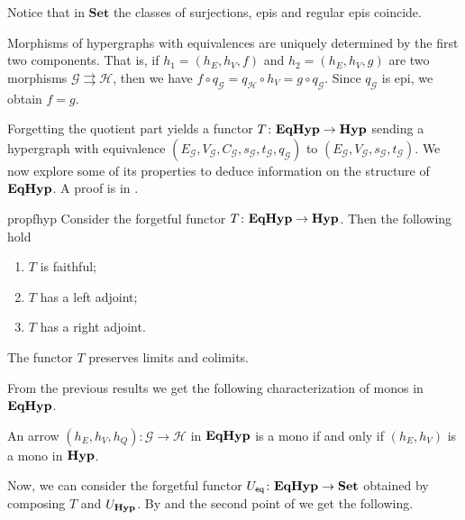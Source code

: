 \documentclass[3p]{elsarticle}
\newcommand{\eq}{\mathsf{eq}}
\newcommand{\Set}{\mathbf{Set}}
\newcommand{\catname}[1]{\textbf{\textup{#1}}}
\newcommand{\hyp}{\catname{Hyp}}
\newcommand{\EqHyp}{\catname{EqHyp}} %
\theoremstyle{remark}
\theoremstyle{definition}
\begin{document}
\begin{rem}
	Notice that in $\Set$ the classes of surjections, epis and regular epis coincide.
\end{rem}

\begin{rem}\label{rem:eqhyp_morphs}
	Morphisms of hypergraphs with equivalences are uniquely determined by the first two components. That is, if $h_1 = (h_E, h_V, f)$ and $h_2 = (h_E, h_V, g)$ are two morphisms $\mathcal{G} \rightrightarrows \mathcal{H}$, then we have
	$
	f \circ q_\mathcal{G} = q_\mathcal{H}\circ h_V =g\circ q_\mathcal{G}.
	$
	Since $q_\mathcal{G}$ is epi, we obtain $f = g$.
\end{rem}

Forgetting the quotient part yields a functor $T\colon \EqHyp \to \hyp$ sending a hypergraph with equivalence $(E_\mathcal{G}, V_{\mathcal{G}}, C_\mathcal{G}, s_\mathcal{G}, t_\mathcal{G}, q_\mathcal{G})$ to $(E_{\mathcal{G}}, V_{\mathcal{G}}, s_\mathcal{G}, t_{\mathcal{G}})$.   We now explore some of its properties to deduce information on the structure of $\EqHyp$.  
%
A proof is in .


\begin{restatable}{prop}{fhyp}\label{prop:forghyp}  Consider the forgetful functor $T\colon \EqHyp \to \hyp$. Then the following hold
	\begin{enumerate}
		\item$T$ is faithful;
		\item $T$ has a left adjoint;
		\item $T$ has a right adjoint.
	\end{enumerate}
\end{restatable}

\begin{cor}\label{cor:limcolim}
	The functor $T$ preserves limits and colimits.
\end{cor}

From the previous results we get the following characterization of monos in $\EqHyp$.

\begin{cor}\label{cor:mono1}
	An arrow $(h_E, h_V, h_Q): \mathcal{G \to H}$ in $\EqHyp$ is a mono if and only if $(h_E, h_V)$ is a mono in $\hyp$.
\end{cor}

Now, we can consider the forgetful functor $U_{\eq}\colon \EqHyp\to \Set$ obtained by composing $T$ and $U_{\hyp}$.  By  and the second point of  we get the following.
\end{document}
